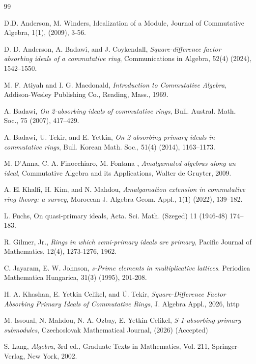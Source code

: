 \documentclass{amsart}%
\begin{document}
\begin{thebibliography}{99}                                                                                               %


D.D. Anderson, M. Winders, Idealization of a Module,
Journal of Commutative Algebra, 1(1), (2009), 3-56.

D. D. Anderson, A. Badawi, and J. Coykendall,
\textit{Square-difference factor absorbing ideals of a commutative ring},
Communications in Algebra, 52(4) (2024), 1542--1550.

M. F. Atiyah and I. G. Macdonald, \textit{Introduction to
Commutative Algebra}, Addison-Wesley Publishing Co., Reading, Mass., 1969.

A. Badawi, \textit{On 2-absorbing ideals of commutative
rings}, Bull. Austral. Math. Soc., 75 (2007), 417--429.

A. Badawi, U. Tekir, and E. Yetkin, \textit{On 2-absorbing
primary ideals in commutative rings}, Bull. Korean Math. Soc., 51(4) (2014), 1163--1173.

M. D'Anna, C. A. Finocchiaro, M. Fontana ,
\textit{Amalgamated algebras along an ideal}, Commutative Algebra and its
Applications, Walter de Gruyter, 2009.

A. El Khalfi, H. Kim, and N. Mahdou,
\textit{Amalgamation extension in commutative ring theory: a survey}, Moroccan
J. Algebra Geom. Appl., 1(1) (2022), 139--182.

L. Fuchs, On quasi-primary ideals, Acta. Sci. Math. (Szeged) 11
(1946-48) 174--183.

R. Gilmer, Jr., \textit{Rings in which semi-primary ideals
are primary}, Pacific Journal of Mathematics, 12(4), 1273-1276, 1962.

C. Jayaram, E. W. Johnson, \textit{s-Prime elements in
multiplicative lattices}. Periodica Mathematica Hungarica, 31(3) (1995), 201-208.

H. A. Khashan, E. Yetkin Celikel, and \"{U}. Tekir,
\textit{Square-Difference Factor Absorbing Primary Ideals of Commutative
Rings}, J. Algebra Appl., 2026, {http}

M. Issoual, N. Mahdou, N. A. Ozbay, E. Yetkin Celikel,
\textit{S-1-absorbing primary submodules}, Czechoslovak Mathematical Journal,
(2026) (Accepted)

S. Lang, \textit{Algebra}, 3rd ed., Graduate Texts in
Mathematics, Vol. 211, Springer-Verlag, New York, 2002.
\end{thebibliography}
\end{document}
